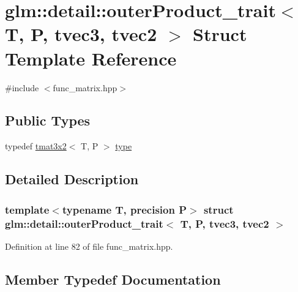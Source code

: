 \hypertarget{structglm_1_1detail_1_1outer_product__trait_3_01_t_00_01_p_00_01tvec3_00_01tvec2_01_4}{}\section{glm\+:\+:detail\+:\+:outer\+Product\+\_\+trait$<$ T, P, tvec3, tvec2 $>$ Struct Template Reference}
\label{structglm_1_1detail_1_1outer_product__trait_3_01_t_00_01_p_00_01tvec3_00_01tvec2_01_4}


{\ttfamily \#include $<$func\+\_\+matrix.\+hpp$>$}

\subsection*{Public Types}
\begin{DoxyCompactItemize}
\item 
typedef \hyperlink{structglm_1_1detail_1_1tmat3x2}{tmat3x2}$<$ T, P $>$ \hyperlink{structglm_1_1detail_1_1outer_product__trait_3_01_t_00_01_p_00_01tvec3_00_01tvec2_01_4_a241608939fa083f2ddb7c701be75a732}{type}
\end{DoxyCompactItemize}


\subsection{Detailed Description}
\subsubsection*{template$<$typename T, precision P$>$\newline
struct glm\+::detail\+::outer\+Product\+\_\+trait$<$ T, P, tvec3, tvec2 $>$}



Definition at line 82 of file func\+\_\+matrix.\+hpp.



\subsection{Member Typedef Documentation}
\mbox{\label{structglm_1_1detail_1_1outer_product__trait_3_01_t_00_01_p_00_01tvec3_00_01tvec2_01_4_a241608939fa083f2ddb7c701be75a732}} 
